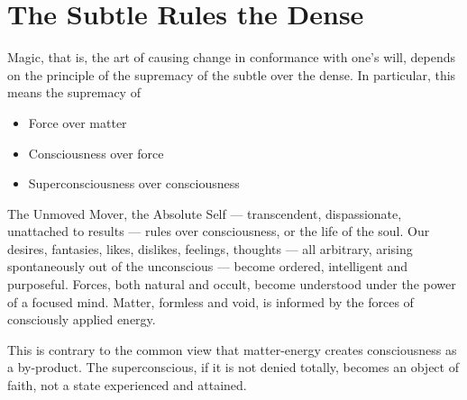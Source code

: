\section{The Subtle Rules the Dense}

Magic, that is, the art of causing change in conformance with one's will, depends on the principle of the supremacy of the subtle over the dense. In particular, this means the supremacy of

\begin{itemize}
\item Force over matter

\item Consciousness over force

\item Superconsciousness over consciousness
\end{itemize}


The Unmoved Mover, the Absolute Self --- transcendent, dispassionate, unattached to results --- rules over consciousness, or the life of the soul. Our desires, fantasies, likes, dislikes, feelings, thoughts --- all arbitrary, arising spontaneously out of the unconscious --- become ordered, intelligent and purposeful. Forces, both natural and occult, become understood under the power of a focused mind. Matter, formless and void, is informed by the forces of consciously applied energy.

This is contrary to the common view that matter-energy creates consciousness as a by-product. The superconscious, if it is not denied totally, becomes an object of faith, not a state experienced and attained.



